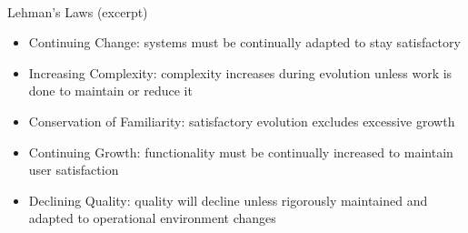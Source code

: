 \begin{frame}{\insertsubsection\ } %
	\begin{fancycolumns}
		\begin{definition}{Lehman's Laws (excerpt)}
			\begin{itemize}
				\item Continuing Change: systems must be continually adapted to stay satisfactory %
				\item Increasing Complexity: complexity increases during evolution unless work is done to maintain or reduce it %
				\item Conservation of Familiarity: satisfactory evolution excludes excessive growth %
				\item Continuing Growth: functionality must be continually increased to maintain user satisfaction %
				\item Declining Quality: quality will decline unless rigorously maintained and adapted to operational environment changes %
			\end{itemize}

\end{definition}
\end{fancycolumns}
\end{frame}
